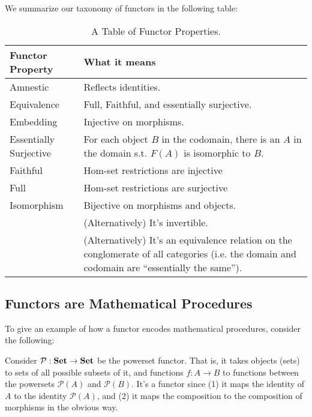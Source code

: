 We summarize our taxonomy of functors in the following table:
\begin{table}[h]
\begin{tabular}{| p{3.5cm} | p{6cm} |}
\hline
\textbf{Functor Property} & \textbf{What it means}\\\hline
Amnestic & Reflects identities.\\ \hline
Equivalence & Full, Faithful, and essentially surjective.\\\hline
Embedding & Injective on morphisms.\\ \hline
Essentially Surjective & For each object $B$ in the codomain,
there is an $A$ in the domain s.t. $F(A)$ is
isomorphic to $B$.\\\hline
Faithful & Hom-set restrictions are injective\\ \hline
Full & Hom-set restrictions are surjective\\ \hline
Isomorphism & Bijective on morphisms and objects.\\\hline
& (Alternatively) It's invertible. \\ \hline
& (Alternatively) It's an equivalence relation on the
conglomerate of all categories (i.e. the domain and codomain are
``essentially the same'').\\ \hline
\end{tabular}
\caption{A Table of Functor Properties.}
\end{table}

\subsection{Functors are Mathematical Procedures}
To give an example of how a functor encodes mathematical
procedures, consider the following:
\begin{ex}\label{ex:powersetFunctor}
Consider $\mathcal{P}:\mathbf{Set}\to\mathbf{Set}$ be the powerset
functor. That is, it takes objects (sets) to sets of all possible
subsets of it, and functions $f:A\to{}B$ to functions between
the powersets $\mathcal{P}(A)$ and $\mathcal{P}(B)$. It's a
functor since (1) it maps the identity of $A$ to the identity
$\mathcal{P}(A)$, and (2) it maps the composition to the
composition of morphisms in the obvious way.
\end{ex}

